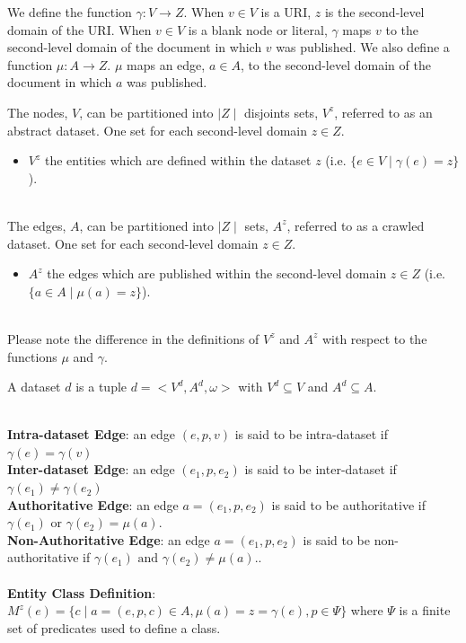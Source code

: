\documentclass[11pt,onecolumn]{article}
\begin{document}
We define the function $\gamma: V \rightarrow Z$. When $v \in V$ is a URI, $z$ is the second-level domain of the URI.  When $v \in V$ is a blank node or literal, $\gamma$  maps $v$ to the second-level domain of the document in which $v$ was published. We also define a function $\mu: A \rightarrow Z$.  $\mu$ maps an edge, $a \in A$, to the second-level domain of the document in which $a$ was published.


The nodes, $V$, can be partitioned into $\mid Z \mid$ disjoints sets, $V^z$, referred to as an abstract dataset.  One set for each second-level domain $z \in Z$.
\begin{itemize}
  \item $V^z$ the entities which are defined within the dataset $z$ (i.e. $\{e \in V \mid \gamma(e) = z \}$).
\end{itemize}\\

The edges, $A$, can be partitioned into $\mid Z \mid$ sets, $A^z$, referred to as a crawled dataset.  One set for each second-level domain $z \in Z$.
\begin{itemize}
  \item $A^z$ the edges which are published within the second-level domain $z \in Z$ (i.e. $\{ a \in A \mid \mu(a) = z \}$).
\end{itemize}\\
Please note the difference in the definitions of $V^z$ and $A^z$ with respect to the functions $\mu$ and $\gamma$.


A dataset $d$ is a tuple $d = < V^d, A^d, \omega >$ with $V^d \subseteq V$ and $A^d \subseteq A$. 



\\
{\bf Intra-dataset Edge}: an edge $(e,p,v)$ is said to be intra-dataset if $\gamma(e) = \gamma(v)$\\
{\bf Inter-dataset Edge}: an edge $(e_1,p,e_2)$ is said to be inter-dataset if $\gamma(e_1) \neq \gamma(e_2)$\\
{\bf Authoritative Edge}: an edge $a =(e_1,p,e_2)$ is said to be authoritative if $\gamma(e_1) \mbox{ or } \gamma(e_2) = \mu(a)$.\\
{\bf Non-Authoritative Edge}: an edge $a = (e_1,p,e_2)$ is said to be non-authoritative if  $\gamma(e_1) \mbox{ and } \gamma(e_2) \neq \mu(a)$..\\
\\
 
{\bf Entity Class Definition}: $ M^z(e) = \{ c \mid  a = (e, p, c ) \in A, \mu(a) = z = \gamma(e) , p \in \Psi \}$ where $\Psi$ is a finite set of predicates used to define a class.\\
\end{document}
